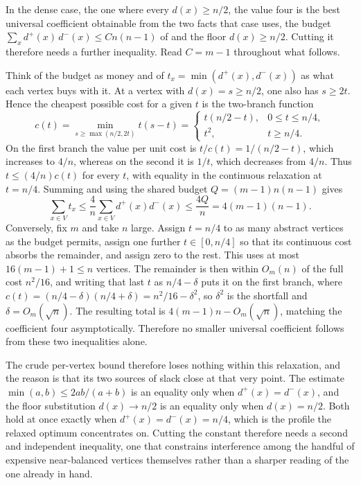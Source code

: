 \begin{remark}\label{rem:case2-tight}
In the dense case, the one where every $d(x) \ge n/2$, the value four is the best universal coefficient obtainable from the two facts that case uses, the budget $\sum_x d^+(x)\,d^-(x) \le C n(n-1)$ of  and the floor $d(x) \ge n/2$. Cutting it therefore needs a further inequality. Read $C = m-1$ throughout what follows.

Think of the budget as money and of $t_x = \min(d^+(x), d^-(x))$ as what each vertex buys with it. At a vertex with $d(x)=s\ge n/2$, one also has $s\ge2t$. Hence the cheapest possible cost for a given $t$ is the two-branch function
\[
 c(t)=\min_{s\ge\max(n/2,2t)}t(s-t)
 =\begin{cases}
 t(n/2-t),&0\le t\le n/4,\\
 t^2,&t\ge n/4.
 \end{cases}
\]
On the first branch the value per unit cost is $t/c(t)=1/(n/2-t)$, which increases to $4/n$, whereas on the second it is $1/t$, which decreases from $4/n$. Thus $t\le(4/n)c(t)$ for every $t$, with equality in the continuous relaxation at $t=n/4$. Summing and using the shared budget $Q=(m-1)n(n-1)$ gives
\[
    \sum_{x\in V}t_x\le\frac4n\sum_{x\in V}d^+(x)d^-(x)
    \le\frac{4Q}{n}=4(m-1)(n-1).
\]
Conversely, fix $m$ and take $n$ large. Assign $t=n/4$ to as many abstract vertices as the budget permits, assign one further $t\in[0,n/4]$ so that its continuous cost absorbs the remainder, and assign zero to the rest. This uses at most $16(m-1)+1\le n$ vertices. The remainder is then within $O_m(n)$ of the full cost $n^2/16$, and writing that last $t$ as $n/4-\delta$ puts it on the first branch, where $c(t)=(n/4-\delta)(n/4+\delta)=n^2/16-\delta^2$, so $\delta^2$ is the shortfall and $\delta=O_m(\sqrt n)$. The resulting total is $4(m-1)n-O_m(\sqrt n)$, matching the coefficient four asymptotically. Therefore no smaller universal coefficient follows from these two inequalities alone.

The crude per-vertex bound therefore loses nothing within this relaxation, and the reason is that its two sources of slack close at that very point. The estimate $\min(a,b)\le2ab/(a+b)$ is an equality only when $d^+(x) = d^-(x)$, and the floor substitution $d(x) \to n/2$ is an equality only when $d(x) = n/2$. Both hold at once exactly when $d^+(x) = d^-(x) = n/4$, which is the profile the relaxed optimum concentrates on. Cutting the constant therefore needs a second and independent inequality, one that constrains interference among the handful of expensive near-balanced vertices themselves rather than a sharper reading of the one already in hand.
\end{remark}

